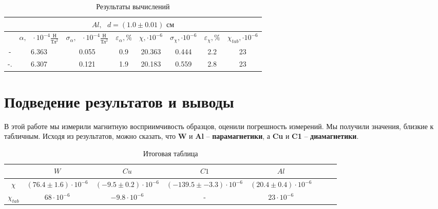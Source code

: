 \documentclass[a4paper,12pt]{article} %
\begin{document}
\begin{enumerate}
\begin{table}[h]
        \begin{tabular}{|c|c|c|c|c|c|c|c|}
		\hline
            \multicolumn{8}{|c|}{$Al, \text{ } d = (1.0 \pm 0.01) \text{ см}$} \\ \hline
            \hline
		&$\alpha, \text{ }\cdot10^{-4}\frac{\text{Н}}{\text{Тл}^2}$ & $\sigma_{\alpha}, \text{ }\cdot10^{-4}\frac{\text{Н}}{\text{Тл}^2}$ & $\varepsilon_{\alpha}, \%$ & $\chi, \cdot10^{-6}$ & $\sigma_{\chi}, \cdot10^{-6}$ & $\varepsilon_{\chi}, \%$ & $\chi_{tab}, \cdot10^{-6}$ \\ \hline
        - & 6.363 & 0.055 & 0.9 & 20.363 & 0.444 & 2.2 & 23 \\ \hline
        -. & 6.307 & 0.121 & 1.9 & 20.183 & 0.559 & 2.8 & 23 \\ \hline
        \end{tabular}
	\caption{Результаты вычислений}
	\label{tab3}
    \end{table}
    
\end{enumerate}

\section{Подведение результатов и выводы}

В этой работе мы измерили магнитную восприимчивость образцов, оценили погрешность измерений. Мы получили значения, близкие к табличным. Исходя из результатов, можно сказать, что \textbf{W} и \textbf{Al} -- \textbf{парамагнетики}, а \textbf{Cu} и \textbf{C1} -- \textbf{диамагнетики}.

\begin{table}[h]
\centering
\begin{tabular}{|c|c|c|c|c|c|c|c|}
    \hline
    & $W$ & $Cu$ & $C1$ & $Al$ \\ \hline
    $\chi$ & $(76.4 \pm 1.6) \cdot 10^{-6}$ & $(-9.5 \pm 0.2) \cdot 10^{-6}$ & $(-139.5 \pm -3.3) \cdot 10^{-6}$ & $(20.4 \pm 0.4) \cdot 10^{-6}$ \\ \hline
    $\chi_{tab}$ & $68 \cdot 10^{-6}$ & $-9.8 \cdot 10^{-6}$ & - & $23 \cdot 10^{-6}$ \\ \hline
\end{tabular}

\caption{Итоговая таблица}
\label{tab3}
\end{table}

\newpage
\end{document}
